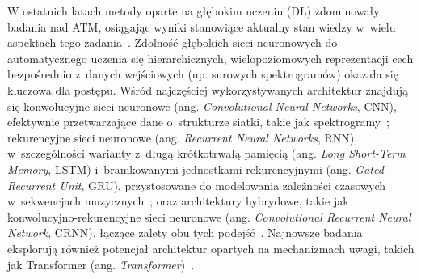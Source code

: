 W ostatnich latach metody oparte na głębokim uczeniu (DL) zdominowały badania nad ATM, osiągając wyniki stanowiące aktualny stan wiedzy w~wielu aspektach tego zadania~\autocite{Benetos2019AutomaticMusicTranscription,Jamshidi2024SurveyAMT}. Zdolność głębokich sieci neuronowych do automatycznego uczenia się hierarchicznych, wielopoziomowych reprezentacji cech bezpośrednio z~danych wejściowych (np. surowych spektrogramów) okazała się kluczowa dla postępu. Wśród najczęściej wykorzystywanych architektur znajdują się konwolucyjne sieci neuronowe (ang. \textit{Convolutional Neural Networks}, CNN), efektywnie przetwarzające dane o~strukturze siatki, takie jak spektrogramy~\autocite{Wiggins2019TabCNN,Zang2023SynthTab}; rekurencyjne sieci neuronowe (ang. \textit{Recurrent Neural Networks}, RNN), w~szczególności warianty z~długą krótkotrwałą pamięcią (ang. \textit{Long Short-Term Memory}, LSTM) i~bramkowanymi jednostkami rekurencyjnymi (ang. \textit{Gated Recurrent Unit}, GRU), przystosowane do modelowania zależności czasowych w~sekwencjach muzycznych~\autocite{Benetos2019AutomaticMusicTranscription}; oraz architektury hybrydowe, takie jak konwolucyjno-rekurencyjne sieci neuronowe (ang. \textit{Convolutional Recurrent Neural Network}, CRNN), łączące zalety obu tych podejść~\autocite{Hawthorne2018Onsets}. Najnowsze badania eksplorują również potencjał architektur opartych na mechanizmach uwagi, takich jak Transformer (ang. \textit{Transformer})~\autocite{Jamshidi2024SurveyAMT,Hawthorne2021Seq2SeqTranscription}.
